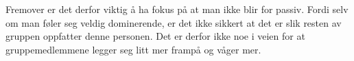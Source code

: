 Fremover er det derfor viktig å ha fokus på at man ikke blir for passiv.
Fordi selv om man føler seg veldig dominerende, er det ikke sikkert at
det er slik resten av gruppen oppfatter denne personen. Det er derfor
ikke noe i veien for at gruppemedlemmene legger seg litt mer frampå og
våger mer.

